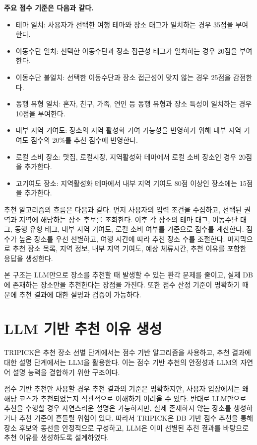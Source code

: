 \documentclass[10pt,a4paper]{article}
\begin{document}
\noindent
\textbf{주요 점수 기준은 다음과 같다.}

\begin{itemize}[leftmargin=2em]
\item 테마 일치: 사용자가 선택한 여행 테마와 장소 태그가 일치하는 경우 35점을 부여한다.
\item 이동수단 일치: 선택한 이동수단과 장소 접근성 태그가 일치하는 경우 20점을 부여한다.
\item 이동수단 불일치: 선택한 이동수단과 장소 접근성이 맞지 않는 경우 25점을 감점한다.
\item 동행 유형 일치: 혼자, 친구, 가족, 연인 등 동행 유형과 장소 특성이 일치하는 경우 10점을 부여한다.
\item 내부 지역 기여도: 장소의 지역 활성화 기여 가능성을 반영하기 위해 내부 지역 기여도 점수의 20\%를 추천 점수에 반영한다.
\item 로컬 소비 장소: 맛집, 로컬시장, 지역활성화 테마에서 로컬 소비 장소인 경우 20점을 추가한다.
\item 고기여도 장소: 지역활성화 테마에서 내부 지역 기여도 80점 이상인 장소에는 15점을 추가한다.
\end{itemize}

추천 알고리즘의 흐름은 다음과 같다. 먼저 사용자의 입력 조건을 수집하고, 선택된 권역과 지역에 해당하는 장소 후보를 조회한다. 이후 각 장소의 테마 태그, 이동수단 태그, 동행 유형 태그, 내부 지역 기여도, 로컬 소비 여부를 기준으로 점수를 계산한다. 점수가 높은 장소를 우선 선별하고, 여행 시간에 따라 추천 장소 수를 조절한다. 마지막으로 추천 장소 목록, 지역 정보, 내부 지역 기여도, 예상 체류시간, 추천 이유를 포함한 응답을 생성한다.

본 구조는 LLM만으로 장소를 추천할 때 발생할 수 있는 환각 문제를 줄이고, 실제 DB에 존재하는 장소만을 추천한다는 장점을 가진다. 또한 점수 산정 기준이 명확하기 때문에 추천 결과에 대한 설명과 검증이 가능하다.

\section{LLM 기반 추천 이유 생성}

TRIPICK은 추천 장소 선별 단계에서는 점수 기반 알고리즘을 사용하고, 추천 결과에 대한 설명 단계에서는 LLM을 활용한다. 이는 점수 기반 추천의 안정성과 LLM의 자연어 설명 능력을 결합하기 위한 구조이다.

점수 기반 추천만 사용할 경우 추천 결과의 기준은 명확하지만, 사용자 입장에서는 왜 해당 코스가 추천되었는지 직관적으로 이해하기 어려울 수 있다. 반대로 LLM만으로 추천을 수행할 경우 자연스러운 설명은 가능하지만, 실제 존재하지 않는 장소를 생성하거나 추천 기준이 흔들릴 위험이 있다. 따라서 TRIPICK은 DB 기반 점수 추천을 통해 장소 후보와 동선을 안정적으로 구성하고, LLM은 이미 선별된 추천 결과를 바탕으로 추천 이유를 생성하도록 설계하였다.
\end{document}
